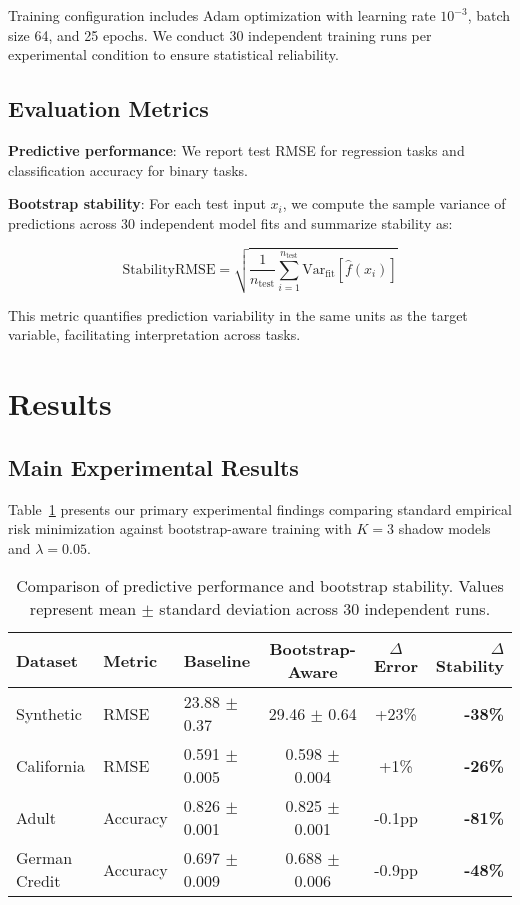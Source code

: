 \documentclass[12pt, letterpaper]{article}
\begin{document}
Training configuration includes Adam optimization with learning rate $10^{-3}$, batch size 64, and 25 epochs. We conduct 30 independent training runs per experimental condition to ensure statistical reliability.

\subsection{Evaluation Metrics}

\textbf{Predictive performance}: We report test RMSE for regression tasks and classification accuracy for binary tasks.

\textbf{Bootstrap stability}: For each test input $x_i$, we compute the sample variance of predictions across 30 independent model fits and summarize stability as:

\begin{equation}
\text{StabilityRMSE} = \sqrt{\frac{1}{n_{\text{test}}}\sum_{i=1}^{n_{\text{test}}} \text{Var}_{\text{fit}}[\hat{f}(x_i)]}
\end{equation}

This metric quantifies prediction variability in the same units as the target variable, facilitating interpretation across tasks.

\section{Results}

\subsection{Main Experimental Results}

Table~\ref{tab:main_results} presents our primary experimental findings comparing standard empirical risk minimization against bootstrap-aware training with $K=3$ shadow models and $\lambda=0.05$.

\begin{table}[t]
\centering
\caption{Comparison of predictive performance and bootstrap stability. Values represent mean $\pm$ standard deviation across 30 independent runs.}
\label{tab:main_results}
\begin{tabular}{lllccr}
\toprule
Dataset & Metric & Baseline & Bootstrap-Aware & $\Delta$ Error & $\Delta$ Stability \\
\midrule
Synthetic & RMSE & 23.88 $\pm$ 0.37 & 29.46 $\pm$ 0.64 & +23\% & \textbf{-38\%} \\
California & RMSE & 0.591 $\pm$ 0.005 & 0.598 $\pm$ 0.004 & +1\% & \textbf{-26\%} \\
Adult & Accuracy & 0.826 $\pm$ 0.001 & 0.825 $\pm$ 0.001 & -0.1pp & \textbf{-81\%} \\
German Credit & Accuracy & 0.697 $\pm$ 0.009 & 0.688 $\pm$ 0.006 & -0.9pp & \textbf{-48\%} \\
\bottomrule
\end{tabular}
\end{table}
\end{document}
